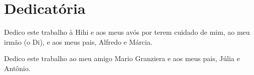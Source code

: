 \chapter*{Dedicatória}

\noindent Dedico este trabalho à Hihi e aos meus avós por terem cuidado de mim, ao meu irmão (o Di), e aos meus pais, Alfredo e Márcia.

\noindent Dedico este trabalho ao meu amigo Mario Granziera e aos meus pais, Júlia e Antônio.